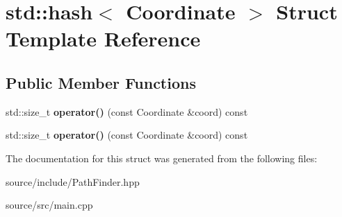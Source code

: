 \hypertarget{structstd_1_1hash_3_01_coordinate_01_4}{}\section{std\+:\+:hash$<$ Coordinate $>$ Struct Template Reference}
\label{structstd_1_1hash_3_01_coordinate_01_4}
\subsection*{Public Member Functions}
\begin{DoxyCompactItemize}
\item 
std\+::size\+\_\+t {\bfseries operator()} (const Coordinate \&coord) const \hypertarget{structstd_1_1hash_3_01_coordinate_01_4_a73c800d2fbb37623684b01a7a6732cd1}{}\label{structstd_1_1hash_3_01_coordinate_01_4_a73c800d2fbb37623684b01a7a6732cd1}

\item 
std\+::size\+\_\+t {\bfseries operator()} (const Coordinate \&coord) const \hypertarget{structstd_1_1hash_3_01_coordinate_01_4_a73c800d2fbb37623684b01a7a6732cd1}{}\label{structstd_1_1hash_3_01_coordinate_01_4_a73c800d2fbb37623684b01a7a6732cd1}

\end{DoxyCompactItemize}


The documentation for this struct was generated from the following files\+:\begin{DoxyCompactItemize}
\item 
source/include/Path\+Finder.\+hpp\item 
source/src/main.\+cpp\end{DoxyCompactItemize}
